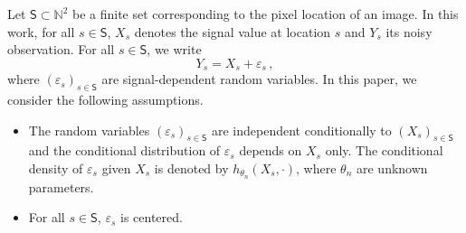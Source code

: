 \documentclass[lettersize,journal]{IEEEtran}
\begin{document}
Let $\mathsf{S}\subset \mathbb{N}^2$ be a finite set corresponding to the pixel location of an image. In this work, for all $s\in\mathsf{S}$, $X_s$ denotes the signal value at location $s$ and $Y_s$ its noisy observation.  For all $s\in \mathsf{S}$, we write %
\begin{equation}
\label{eq:def:Y}
Y_s = X_s + \varepsilon_s\,,
\end{equation}
where  $(\varepsilon_s)_{s\in \mathsf{S}}$ are signal-dependent random variables. In this paper, we consider the following assumptions.
\begin{itemize}
\item The random variables  $(\varepsilon_s)_{s\in \mathsf{S}}$ are independent conditionally to $(X_s)_{s\in \mathsf{S}}$ and the conditional distribution of $\varepsilon_s$ depends on $X_s$ only. The conditional density of $\varepsilon_s$ given $X_s$ is denoted by $h_{\theta_n}(X_s,\cdot)$, where $\theta_n$ are unknown parameters.
\item For all $s\in \mathsf{S}$, $\varepsilon_s$ is centered.
\end{itemize}
\end{document}
